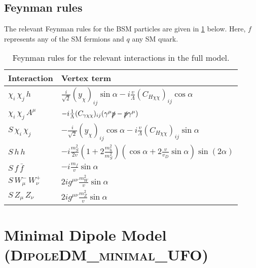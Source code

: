 \documentclass[a4paper,11pt]{article}
\begin{document}
\subsection*{Feynman rules}

The relevant Feynman rules for the BSM particles are given in \cref{tab:feynmanRules} below. Here, $f$ represents any of the SM fermions and $q$ any SM quark.

\begin{table}[h!]   \centering
    \vspace{0.2cm}
        \caption{Feynman rules for the relevant interactions in the full model. \label{tab:feynmanRules}}
    \begin{tabular}{p{2cm}|p{8.5cm}}
      \toprule
      \textbf{Interaction} & \textbf{Vertex term}\\ \toprule 
      $\chi_i\,\chi_j\,h$  & $ \frac{i}{\sqrt{2}} (y_{\chi})_{ij} \sin\alpha -i \frac{v}{\Lambda} (C_{H\chi\chi})_{ij} \cos\alpha $\\
      $\chi_i\,\chi_j\, A^\mu$  & $-i \frac{1}{\Lambda} (C_{\gamma\chi\chi})_{ij} (\gamma^\mu \slashed{p} - \slashed{p} \gamma^\mu)$\\
      $S\,\chi_i\,\chi_j$  & $ -\frac{i}{\sqrt{2}} (y_{\chi})_{ij} \cos\alpha -i \frac{v}{\Lambda} (C_{H\chi\chi})_{ij} \sin\alpha $\\      
      $S\,h\,h$  & $- i \frac{m_{S}^{2}}{2 v}  \left( 1 + 2 \frac{m_{h}^{2}}{m_{S}^{2}}\right)  \left( \cos\alpha + 2 \frac{v}{v_D} \sin\alpha \right)  \sin (2\alpha)$\\
      $S\,f\,\bar{f}$  & $-i \frac{m_f}{v} \sin\alpha$ \\      
      $S\,W_\mu^-\,W_\nu^+$  & $2 i g^{\mu\nu} \frac{m_{W}^2}{v} \sin\alpha$\\
      $S\,Z_\mu\,Z_\nu$  & $2 i g^{\mu\nu} \frac{m_{Z}^2}{v} \sin\alpha$\\
      \bottomrule        
    \end{tabular}
\end{table}

\newpage
\section{Minimal Dipole Model (\textsc{\small DipoleDM\_minimal\_UFO})}
\end{document}
